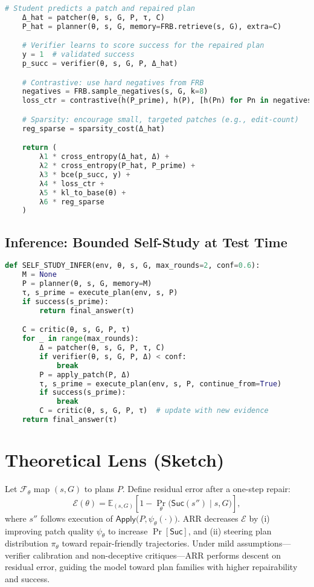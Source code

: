 \documentclass[11pt]{article}
\newcommand{\Suc}{\mathsf{Suc}}
\begin{document}
\begin{lstlisting}[language=Python, caption={Training with Self-Study (EMA teacher variant).}, label={lst:train}]
    # Student predicts a patch and repaired plan
    Δ_hat = patcher(θ, s, G, P, τ, C)
    P_hat = planner(θ, s, G, memory=FRB.retrieve(s, G), extra=C)

    # Verifier learns to score success for the repaired plan
    y = 1  # validated success
    p_succ = verifier(θ, s, G, P, Δ_hat)

    # Contrastive: use hard negatives from FRB
    negatives = FRB.sample_negatives(s, G, k=8)
    loss_ctr = contrastive(h(P_prime), h(P), [h(Pn) for Pn in negatives])

    # Sparsity: encourage small, targeted patches (e.g., edit-count)
    reg_sparse = sparsity_cost(Δ_hat)

    return (
        λ1 * cross_entropy(Δ_hat, Δ) +
        λ2 * cross_entropy(P_hat, P_prime) +
        λ3 * bce(p_succ, y) +
        λ4 * loss_ctr +
        λ5 * kl_to_base(θ) +
        λ6 * reg_sparse
    )
\end{lstlisting}

\subsection{Inference: Bounded Self-Study at Test Time}
\begin{lstlisting}[language=Python, caption={Inference with bounded repair loops.}, label={lst:infer}]
def SELF_STUDY_INFER(env, θ, s, G, max_rounds=2, conf=0.6):
    M = None
    P = planner(θ, s, G, memory=M)
    τ, s_prime = execute_plan(env, s, P)
    if success(s_prime): 
        return final_answer(τ)

    C = critic(θ, s, G, P, τ)
    for _ in range(max_rounds):
        Δ = patcher(θ, s, G, P, τ, C)
        if verifier(θ, s, G, P, Δ) < conf: 
            break
        P = apply_patch(P, Δ)
        τ, s_prime = execute_plan(env, s, P, continue_from=True)
        if success(s_prime): 
            break
        C = critic(θ, s, G, P, τ)  # update with new evidence
    return final_answer(τ)
\end{lstlisting}

\section{Theoretical Lens (Sketch)}
Let $\mathcal{F}_\theta$ map $(s,G)$ to plans $P$. Define residual error after a one-step repair:
\[
\mathcal{E}(\theta) = \mathbb{E}_{(s,G)}\!\left[1 - \Pr_\theta\!\big(\Suc(s'') \mid s,G\big)\right],
\]
where $s''$ follows execution of $\mathsf{Apply}\!\big(P,\psi_\theta(\cdot)\big)$. ARR decreases $\mathcal{E}$ by (i) improving patch quality $\psi_\theta$ to increase $\Pr[\Suc]$, and (ii) steering plan distribution $\pi_\theta$ toward repair-friendly trajectories. Under mild assumptions---verifier calibration and non-deceptive critiques---ARR performs descent on residual error, guiding the model toward plan families with higher repairability and success.
\end{document}
